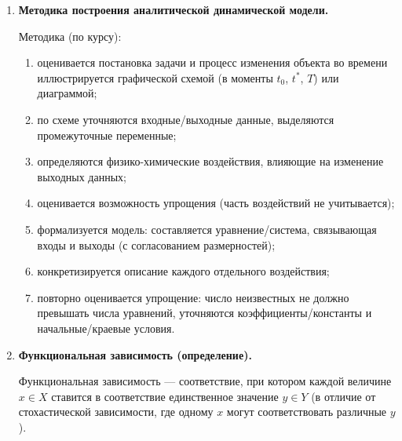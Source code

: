 \documentclass[12pt,a4paper]{article}
\begin{document}
\begin{enumerate}[label=\textbf{\arabic*.}]
Модельное время — дискретное время в единицах реального времени, обеспечивающее внутреннюю и внешнюю синхронизацию компонент модели. При выборе \textbf{переменного шага} кванты модельного времени зависят от событийной структуры процесса:
\begin{itemize}
\item если два и более событий должны быть описаны в один и тот же момент модельного времени, выполняют последовательное описание компонент с последующей коррекцией кванта;
\item если в реальной системе длительное время не возникает новых событий, шаг увеличивают (иначе имитация «простаивает»).
\end{itemize}
В практической реализации это приводит к событийной дискретизации (шаг равен времени до ближайшего события) или к адаптивной схеме изменения шага.

\item \textbf{Методика построения аналитической динамической модели.}

Методика (по курсу):
\begin{enumerate}[label=\arabic*)]
\item оценивается постановка задачи и процесс изменения объекта во времени иллюстрируется графической схемой (в моменты $t_0$, $t^{*}$, $T$) или диаграммой;
\item по схеме уточняются входные/выходные данные, выделяются промежуточные переменные;
\item определяются физико-химические воздействия, влияющие на изменение выходных данных;
\item оценивается возможность упрощения (часть воздействий не учитывается);
\item формализуется модель: составляется уравнение/система, связывающая входы и выходы (с согласованием размерностей);
\item конкретизируется описание каждого отдельного воздействия;
\item повторно оценивается упрощение: число неизвестных не должно превышать числа уравнений, уточняются коэффициенты/константы и начальные/краевые условия.
\end{enumerate}

\item \textbf{Функциональная зависимость (определение).}

Функциональная зависимость — соответствие, при котором каждой величине $x\in X$ ставится в соответствие единственное значение $y\in Y$ (в отличие от стохастической зависимости, где одному $x$ могут соответствовать различные $y$).


\end{enumerate}
\end{document}
